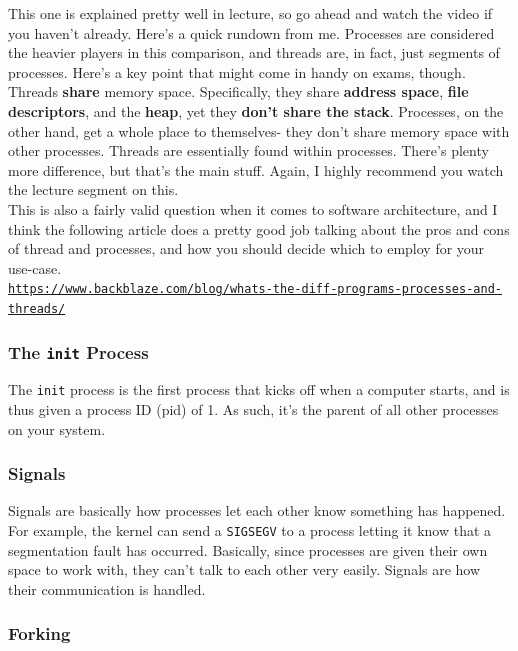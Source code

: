 \documentclass[english, 10pt]{article}
\begin{document}
This one is explained pretty well in lecture, so go ahead and watch the video if you haven't already. Here's a quick rundown from me. Processes are considered the heavier players in this comparison, and threads are, in fact, just segments of processes. Here's a key point that might come in handy on exams, though. Threads \textbf{share} memory space. Specifically, they share \textbf{address space}, \textbf{file descriptors}, and the \textbf{heap}, yet they \textbf{don't share the stack}. Processes, on the other hand, get a whole place to themselves- they don't share memory space with other processes. Threads are essentially found within processes. There's plenty more difference, but that's the main stuff. Again, I highly recommend you watch the lecture segment on this.\\

This is also a fairly valid question when it comes to software architecture, and I think the following article does a pretty good job talking about the pros and cons of thread and processes, and how you should decide which to employ for your use-case.\\

\texttt{\href{https://www.backblaze.com/blog/whats-the-diff-programs-processes-and-threads/}{https://www.backblaze.com/blog/whats-the-diff-programs-processes-and-threads/}}

\subsubsection{The \texttt{init} Process}

The \texttt{init} process is the first process that kicks off when a computer starts, and is thus given a process ID (pid) of 1. As such, it's the parent of all other processes on your system.

\subsubsection{Signals}

Signals are basically how processes let each other know something has happened. For example, the kernel can send a \texttt{SIGSEGV} to a process letting it know that a segmentation fault has occurred. Basically, since processes are given their own space to work with, they can't talk to each other very easily. Signals are how their communication is handled.

\subsubsection{Forking}
\end{document}
